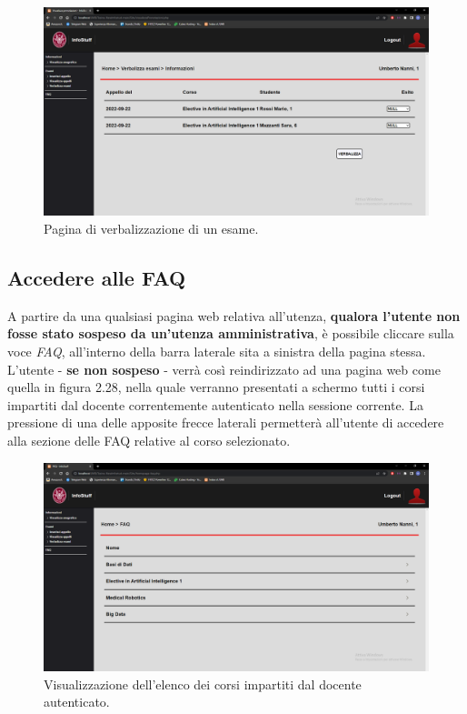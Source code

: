 \documentclass [a4paper,11pt]{book}
\begin{document}
\begin{figure}
\centering
\includegraphics[scale=0.3]{figura2-27.png}
\caption{Pagina di verbalizzazione di un esame.}
\end{figure}

\medskip

\subsection{Accedere alle FAQ}

A partire da una qualsiasi pagina web relativa all'utenza, \textbf{qualora l'utente non fosse stato sospeso da un'utenza amministrativa}, è possibile cliccare sulla voce \emph{FAQ}, all'interno della barra laterale sita a sinistra della pagina stessa. L'utente - \textbf{se non sospeso} - verrà così reindirizzato ad una pagina web come quella in figura 2.28, nella quale verranno presentati a schermo tutti i corsi impartiti dal docente correntemente autenticato nella sessione corrente. La pressione di una delle apposite frecce laterali permetterà all'utente di accedere alla sezione delle FAQ relative al corso selezionato.

\begin{figure}
\centering
\includegraphics[scale=0.3]{figura2-28.png}
\caption{Visualizzazione dell'elenco dei corsi impartiti dal docente autenticato.}
\end{figure}
\end{document}
